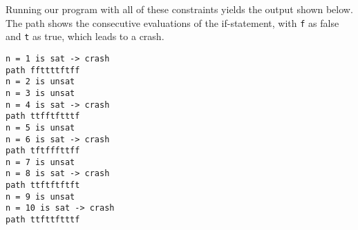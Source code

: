 \documentclass{scrartcl}
\begin{document}
Running our program with all of these constraints yields the output shown
below. The path shows the consecutive evaluations of the if-statement, with
\texttt{f} as false and \texttt{t} as true, which leads to a crash.

\begin{verbatim}
n = 1 is sat -> crash
path ffttttftff
n = 2 is unsat
n = 3 is unsat
n = 4 is sat -> crash
path ttfftftttf
n = 5 is unsat
n = 6 is sat -> crash
path tftfffttff
n = 7 is unsat
n = 8 is sat -> crash
path ttftftftft
n = 9 is unsat
n = 10 is sat -> crash
path ttfttftttf
\end{verbatim}
\end{document}
